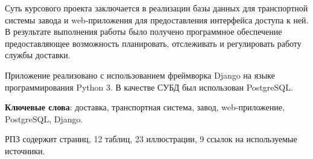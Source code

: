 Суть курсового проекта заключается в реализации базы данных для транспортной системы завода и web-приложения для предоставления интерфейса доступа к ней. В результате выполнения работы было получено программное обеспечение предоставляющее возможность планировать, отслеживать и регулировать работу службы доставки.

Приложение реализовано с использованием фреймворка Django на языке программирования Python 3. В качестве СУБД был использован PostgreSQL.

\textbf{Ключевые слова}: доставка, транспортная система, завод, web-приложение, PostgreSQL, Django.

РПЗ содержит \pageref{lastpage} страниц, 
12 таблиц,
23 иллюстрации,
9 ссылок на используемые источники.

